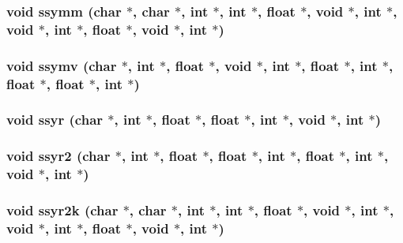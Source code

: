 \subsubsection{\setlength{\rightskip}{0pt plus 5cm}void ssymm (char $\ast$, char $\ast$, int $\ast$, int $\ast$, float $\ast$, void $\ast$, int $\ast$, void $\ast$, int $\ast$, float $\ast$, void $\ast$, int $\ast$)}\label{essl_8h_8948ad8ea433cf89430a6109e6abe67e}


\subsubsection{\setlength{\rightskip}{0pt plus 5cm}void ssymv (char $\ast$, int $\ast$, float $\ast$, void $\ast$, int $\ast$, float $\ast$, int $\ast$, float $\ast$, float $\ast$, int $\ast$)}\label{essl_8h_750d44c0851fe7bd55425ef288a74287}


\subsubsection{\setlength{\rightskip}{0pt plus 5cm}void ssyr (char $\ast$, int $\ast$, float $\ast$, float $\ast$, int $\ast$, void $\ast$, int $\ast$)}\label{essl_8h_77ebbf7e17d11fcd1acd30dbe043abc9}


\subsubsection{\setlength{\rightskip}{0pt plus 5cm}void ssyr2 (char $\ast$, int $\ast$, float $\ast$, float $\ast$, int $\ast$, float $\ast$, int $\ast$, void $\ast$, int $\ast$)}\label{essl_8h_d0db7733efd594d7994f421f343e6532}


\subsubsection{\setlength{\rightskip}{0pt plus 5cm}void ssyr2k (char $\ast$, char $\ast$, int $\ast$, int $\ast$, float $\ast$, void $\ast$, int $\ast$, void $\ast$, int $\ast$, float $\ast$, void $\ast$, int $\ast$)}\label{essl_8h_52800d83bf0d2a372afa71e44d54991b}


